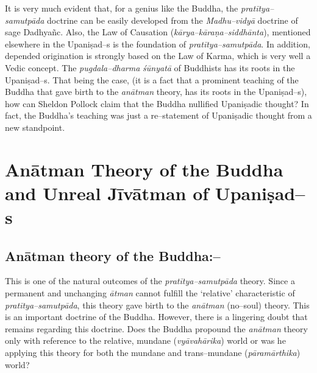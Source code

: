 It is very much evident that, for a genius like the Buddha, the \textit{pratītya–samutpāda} doctrine can be easily developed from the \textit{Madhu–vidyā} doctrine of sage Dadhyañc. Also, the Law of Causation (\textit{kārya–kāraṇa–siddhānta}), mentioned elsewhere in the Upaniṣad–s is the foundation of \textit{pratītya–samutpāda}. In addition, depended origination is strongly based on the Law of Karma, which is very well a Vedic concept. The \textit{pugdala–dharma} \textit{śūnyatā} of Buddhists has its roots in the Upaniṣad–s. That being the case, (it is a fact that a prominent teaching of the Buddha that gave birth to the \textit{anātman} theory, has its roots in the Upaniṣad–s), how can Sheldon Pollock claim that the Buddha nullified Upaniṣadic thought? In fact, the Buddha’s teaching was just a re–statement of Upaniṣadic thought from a new standpoint.


\section*{Anātman Theory of the Buddha and Unreal Jīvātman of Upaniṣad–s}

\subsection*{Anātman theory of the Buddha:–}

This is one of the natural outcomes of the \textit{pratītya–samutpāda} theory. Since a permanent and unchanging \textit{ātman} cannot fulfill the ‘relative’ characteristic of \textit{pratītya–samutpāda}, this theory gave birth to the \textit{anātman} (no–soul) theory. This is an important doctrine of the Buddha. However, there is a lingering doubt that remains regarding this doctrine. Does the Buddha propound the \textit{anātman} theory only with reference to the relative, mundane (\textit{vyāvahārika}) world or was he applying this theory for both the mundane and trans–mundane (\textit{pāramārthika}) world?


